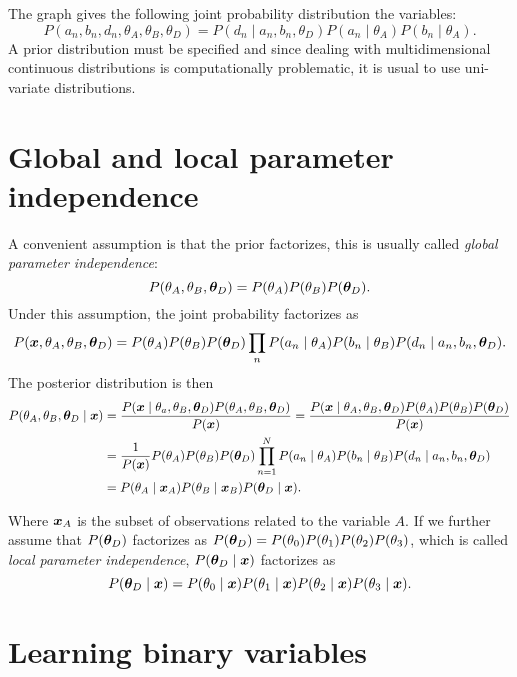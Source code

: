 The graph gives the following joint probability distribution the variables:
\[
P(a_{n},b_{n},d_{n}, \theta_A, \theta_B, \theta_D) = P(d_{n}\mid a_{n},b_{n},\theta_D)P(a_{n} \mid \theta_A)P(b_{n} \mid \theta_A).
\]
A prior distribution must be specified and since dealing with multidimensional continuous
distributions is computationally problematic, it is usual to use uni-variate
distributions.

\section{Global and local parameter independence}

A convenient assumption is that the prior factorizes, this is usually called
\emph{global parameter independence}:
\[
  P(\theta_{A}, \theta_{B}, \bm{\theta}_{D}) = P(\theta_{A})P(\theta_{B})P(\bm{\theta}_{D}).
\]
Under this assumption, the joint probability factorizes as
\[
  P(\bm{x}, \theta_{A}, \theta_{B}, \bm{\theta}_{D}) = P(\theta_{A})P(\theta_{B})P(\bm{\theta}_{D})\prod_{n}P(a_{n}\mid \theta_{A})P(b_{n} \mid \theta_{B})P(d_{n}\mid a_{n}, b_{n}, \bm{\theta}_{D}).
\]
The posterior distribution is then
\[
  \begin{aligned}
    P(\theta_{A}, \theta_{B}, \bm{\theta}_{D}\mid \bm{x})
    &= \frac{P(\bm{x} \mid \theta_{a}, \theta_{B}, \bm{\theta}_{D})P(\theta_{A}, \theta_{B}, \bm{\theta}_{D})}{P(\bm{x})} =\frac{P(\bm{x} \mid \theta_{A}, \theta_{B}, \bm{\theta}_{D})P(\theta_{A}) P(\theta_{B})P( \bm{\theta}_{D})}{P(\bm{x})}\\
    &= \frac{1}{P(\bm{x})}P(\theta_{A})P(\theta_{B})P(\bm{\theta}_{D})\prod_{n=1}^{N}P(a_{n}\mid \theta_{A})P(b_{n}\mid \theta_{B})P(d_{n}\mid a_{n}, b_{n},\bm{\theta}_{D})\\
    &= P(\theta_{A} \mid \bm{x}_{A} )P(\theta_{B}\mid \bm{x}_{B})P(\bm{\theta}_{D} \mid \bm{x}).
  \end{aligned}
\]

Where \(\bm{x}_{A}\) is the subset of observations related to the variable \(A\). If we further assume that \(P(\bm{\theta}_{D})\) factorizes as
\(P(\bm{\theta}_{D}) = P(\theta_{0})P(\theta_{1})P(\theta_{2})P(\theta_{3})\),
which is called \emph{local parameter independence}, \(P(\bm{\theta}_{D} \mid \bm{x})\) factorizes as
\[
  P(\bm{\theta}_{D}\mid \bm{x}) = P(\theta_{0} \mid \bm{x} )P(\theta_{1} \mid \bm{x} )P(\theta_{2} \mid \bm{x} )P(\theta_{3} \mid \bm{x} ).
\]

\section{Learning binary variables}

